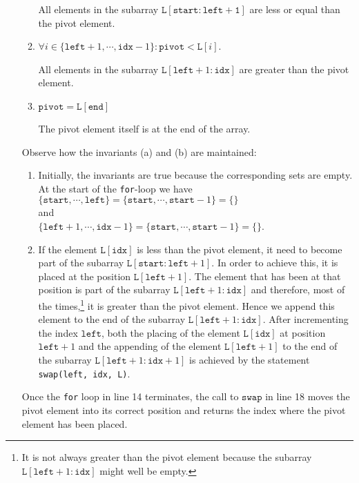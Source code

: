 \begin{enumerate}
\begin{enumerate}
            All elements in the subarray $\mathtt{L[start:left+1]}$ are less or equal than the pivot element.
      \item $\forall i \in \{ \mathtt{left}+1,\cdots,\mathtt{idx}-1\}:\mathtt{pivot} < \mathtt{L}[i]$.

            All elements in the subarray $\mathtt{L}[\mathtt{left}+1:\mathtt{idx}]$ are greater than the pivot
            element.
      \item $\mathtt{pivot} = \mathtt{L[end]}$

            The pivot element itself is at the end of the array.
      \end{enumerate}
      Observe how the invariants (a) and (b) are maintained:
      \begin{enumerate}
      \item Initially, the invariants are true because the corresponding sets are empty.
            At the start of the \texttt{for}-loop we have
            \\[0.2cm]
            \hspace*{1.3cm}
            $\{ \mathtt{start}, \cdots, \mathtt{left} \} = \{ \mathtt{start}, \cdots, \mathtt{start} - 1\} = \{\}$
            \\
            and
            \\
            \hspace*{1.3cm}
            $\{ \mathtt{left}+1,\cdots,\mathtt{idx}-1\} =  \{ \mathtt{start},\cdots,\mathtt{start}-1\}=\{\}$.
      \item If the element $\mathtt{L[idx]}$ is less than the
            pivot element, it need to become part of the subarray $\mathtt{L}[\mathtt{start}:\mathtt{left}+1]$.  In order to
            achieve this, it is placed at the position $\mathtt{L}[\mathtt{left}+1]$.  The element that has been at
            that position is part of the subarray $\mathtt{L}[\mathtt{left}+1:\mathtt{idx}]$ and therefore,
            most of the times,\footnote{
              It is not always greater than the pivot element
              because the subarray $\mathtt{L}[\mathtt{left}+1:\mathtt{idx}]$ might well be empty.}
            it is greater than the pivot element.  
            Hence we append this element to the end of the subarray
            $\mathtt{L}[\mathtt{left}+1:\mathtt{idx}]$.  After incrementing the index $\mathtt{left}$,
            both the placing of the element $\mathtt{L[idx]}$ at position $\mathtt{left}+1$ and the appending
            of the element $\mathtt{L}[\mathtt{left}+1]$ to the end of the subarray
            $\mathtt{L}[\mathtt{left}+1:\mathtt{idx}+1]$ is achieved by the statement
            \\[0.2cm]
            \hspace*{1.3cm}
            \texttt{swap(left, idx, L)}.            
      \end{enumerate}
      Once the \texttt{for} loop in line 14 terminates, the call to $\mathtt{swap}$ in line 18 moves
      the pivot element into its correct position and returns the index where the pivot element has been
      placed. 
\end{enumerate}


